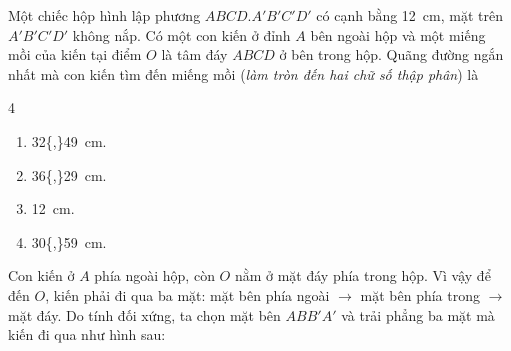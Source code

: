 \begin{baitap}
	Một chiếc hộp hình lập phương $ABCD.A'B'C'D'$ có cạnh bằng \qty{12}{\centi\meter}, mặt trên $A'B'C'D'$ không nắp. Có một con kiến ở đỉnh $A$ bên ngoài hộp và một miếng mồi của kiến tại điểm $O$ là tâm đáy $ABCD$ ở bên trong hộp. Quãng đường ngắn nhất mà con kiến tìm đến miếng mồi (\textit{làm tròn đến hai chữ số thập phân}) là
	\begin{multicols}{4}
		\begin{enumerate}
			\item \qty{32{,}49}{\centi\meter}.
			\item \qty{36{,}29}{\centi\meter}.
			\item \qty{12}{\centi\meter}.
			\item \qty{30{,}59}{\centi\meter}.
		\end{enumerate}
	\end{multicols}
	\begin{traloi}
		Con kiến ở \(A\) phía ngoài hộp, còn \(O\) nằm ở mặt đáy phía trong hộp. Vì vậy để đến \(O\), kiến phải đi qua ba mặt: mặt bên phía ngoài \(\to\) mặt bên phía trong \(\to\) mặt đáy.  Do tính đối xứng, ta chọn mặt bên \(ABB'A'\) và trải phẳng ba mặt mà kiến đi qua như hình sau:
		\begin{center}
\end{center}
\end{traloi}
\end{baitap}
